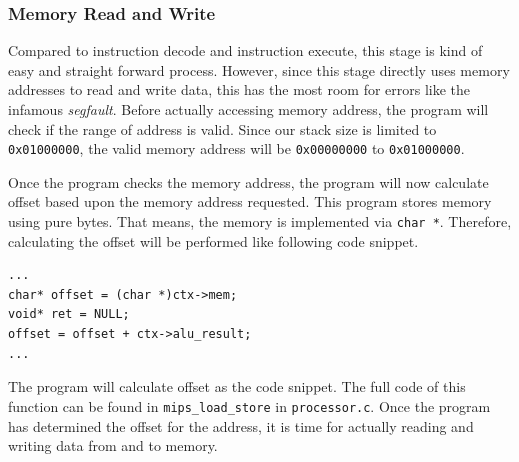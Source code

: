 \documentclass{homework}
\begin{document}
\subsubsection{Memory Read and Write}
Compared to instruction decode and instruction execute, this stage is kind of easy and straight forward process. However, since this stage directly uses memory addresses to read and write data, this has the most room for errors like the infamous \textit{segfault}. Before actually accessing memory address, the program will check if the range of address is valid. Since our stack size is limited to \texttt{0x01000000}, the valid memory address will be \texttt{0x00000000} to \texttt{0x01000000}. 

Once the program checks the memory address, the program will now calculate offset based upon the memory address requested. This program stores memory using pure bytes. That means, the memory is implemented via \texttt{char *}. Therefore, calculating the offset will be performed like following code snippet.
\\
\begin{center}
\begin{code}
\begin{verbatim}
...
char* offset = (char *)ctx->mem;
void* ret = NULL;
offset = offset + ctx->alu_result;
...
\end{verbatim}
\end{code}
\end{center}
The program will calculate offset as the code snippet. The full code of this function can be found in \texttt{mips_load_store} in \texttt{processor.c}. Once the program has determined the offset for the address, it is time for actually reading and writing data from and to memory. 
\end{document}
